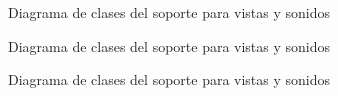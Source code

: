 \documentclass[a4paper]{article}
\begin{document}
\begin{figure}[!h]
	\caption{Diagrama de clases del soporte para vistas y sonidos}
	\label{fig:diagram7}
\end{figure}


\begin{figure}[!h]
	\caption{Diagrama de clases del soporte para vistas y sonidos}
	\label{fig:diagram8}
\end{figure}


\begin{figure}[!h]
	\caption{Diagrama de clases del soporte para vistas y sonidos}
	\label{fig:diagram9}
\end{figure}
\end{document}
